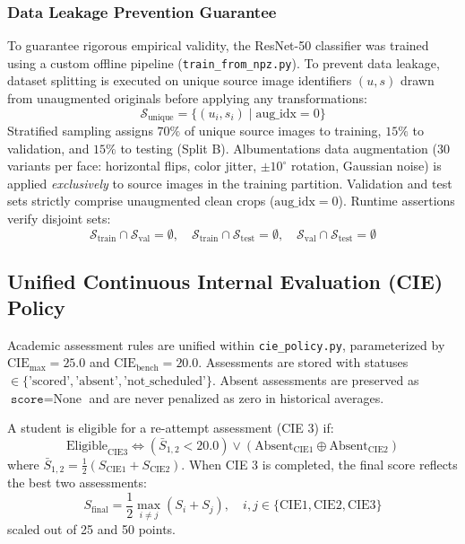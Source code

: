 \documentclass[conference]{IEEEtran}
\begin{document}
\subsubsection{Data Leakage Prevention Guarantee}
To guarantee rigorous empirical validity, the ResNet-50 classifier was trained using a custom offline pipeline (\texttt{train\_from\_npz.py}). To prevent data leakage, dataset splitting is executed on unique source image identifiers $(u, s)$ drawn from unaugmented originals before applying any transformations:
\begin{equation}
\mathcal{S}_{\text{unique}} = \{(u_i, s_i) \mid \text{aug\_idx} = 0\}
\end{equation}
Stratified sampling assigns $70\%$ of unique source images to training, $15\%$ to validation, and $15\%$ to testing (Split B). Albumentations data augmentation (30 variants per face: horizontal flips, color jitter, $\pm 10^\circ$ rotation, Gaussian noise) is applied \textit{exclusively} to source images in the training partition. Validation and test sets strictly comprise unaugmented clean crops ($\text{aug\_idx}=0$). Runtime assertions verify disjoint sets:
\begin{equation}
\mathcal{S}_{\text{train}} \cap \mathcal{S}_{\text{val}} = \emptyset, \quad \mathcal{S}_{\text{train}} \cap \mathcal{S}_{\text{test}} = \emptyset, \quad \mathcal{S}_{\text{val}} \cap \mathcal{S}_{\text{test}} = \emptyset
\end{equation}

\subsection{Unified Continuous Internal Evaluation (CIE) Policy}
Academic assessment rules are unified within \texttt{cie\_policy.py}, parameterized by $\text{CIE}_{\max} = 25.0$ and $\text{CIE}_{\text{bench}} = 20.0$. Assessments are stored with statuses $\in \{\text{'scored'}, \text{'absent'}, \text{'not\_scheduled'}\}$. Absent assessments are preserved as $\texttt{score}=\text{None}$ and are never penalized as zero in historical averages.

A student is eligible for a re-attempt assessment (CIE 3) if:
\begin{equation}
\text{Eligible}_{\text{CIE3}} \iff (\bar{S}_{1,2} < 20.0) \lor (\text{Absent}_{\text{CIE1}} \oplus \text{Absent}_{\text{CIE2}})
\end{equation}
where $\bar{S}_{1,2} = \frac{1}{2}(S_{\text{CIE1}} + S_{\text{CIE2}})$. When CIE 3 is completed, the final score reflects the best two assessments:
\begin{equation}
S_{\text{final}} = \frac{1}{2} \max_{i \neq j} (S_i + S_j), \quad i,j \in \{\text{CIE1}, \text{CIE2}, \text{CIE3}\}
\end{equation}
scaled out of 25 and 50 points.
\end{document}
